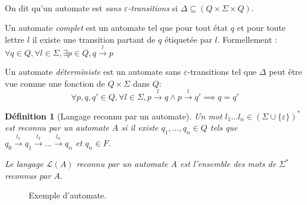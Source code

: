 \documentclass[conference]{IEEEtran}
\newtheorem{mydef}{D\'efinition}
\begin{document}
\paragraph{}
On dit qu'un automate est \emph{sans $\varepsilon$-transitions} si $\Delta \subseteq (Q\times \Sigma \times Q)$.

Un automate \emph{complet} est un automate tel que pour tout \'etat $q$ et pour toute lettre $l$ il existe une transition partant de $q$ \'etiquet\'ee par $l$. Formellement : $\forall q \in Q, \forall l \in \Sigma, \exists p\in Q, q\overset{l}{\to}p$

Un automate \emph{d\'eterministe} est un automate sans $\varepsilon$-transitions tel que $\Delta$ peut \^etre vue comme une fonction de $Q\times \Sigma$ dans $Q$: $$\forall p,q,q' \in Q, \forall l \in \Sigma, p\overset{l}{{\to}}q \land p\overset{l}{{\to}}q' \implies q=q'$$

\begin{mydef}[Langage reconnu par un automate]
Un mot $l_1...l_n \in \left(\Sigma\cup \{\varepsilon\}\right)^*$ est reconnu par un automate $A$ si il existe $q_1,...,q_n \in Q$ tels que $q_0 \overset{l_1}{{\to}} q_1 \overset{l_2}{{\to}} \dots \overset{l_n}{{\to}} q_{n}$ et $q_{n} \in F$.

Le langage $\mathcal{L}(A)$ reconnu par un automate $A$ est l'ensemble des mots de $\Sigma^*$ reconnus par $A$.
\end{mydef}

\begin{figure}[H]

  \begin{center}
   \end{center}
    \caption{Exemple d'automate.}
\end{figure}
\end{document}
